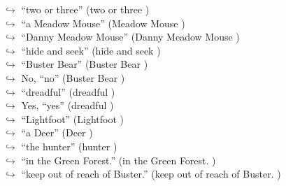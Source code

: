 \documentclass[11pt,a4paper, onecolumn]{article}
\begin{document}
\begin{figure}[t] \small \begin{tcolorbox}[boxsep=0pt,left=5pt,right=0pt,top=2pt,colback = yellow!5] \begin{dialogue}
 \small 
\colorbox{pink!25}{$\hookrightarrow$}
{ ``two or three'' (two or three ) }
\\
\colorbox{pink!25}{$\hookrightarrow$}
{ ``a Meadow Mouse'' (Meadow Mouse ) }
\\
\colorbox{pink!25}{$\hookrightarrow$}
{ ``Danny Meadow Mouse'' (Danny Meadow Mouse ) }
\\
\colorbox{pink!25}{$\hookrightarrow$}
{ ``hide and seek'' (hide and seek ) }
\\
\colorbox{pink!25}{$\hookrightarrow$}
{ ``Buster Bear'' (Buster Bear ) }
\\
\colorbox{pink!25}{$\hookrightarrow$}
\colorbox{red!25}{No,}
{ ``no'' (Buster Bear ) }
\\
\colorbox{pink!25}{$\hookrightarrow$}
{ ``dreadful'' (dreadful ) }
\\
\colorbox{pink!25}{$\hookrightarrow$}
\colorbox{red!25}{Yes,}
{ ``yes'' (dreadful ) }
\\
\colorbox{pink!25}{$\hookrightarrow$}
{ ``Lightfoot'' (Lightfoot ) }
\\
\colorbox{pink!25}{$\hookrightarrow$}
{ ``a Deer'' (Deer ) }
\\
\colorbox{pink!25}{$\hookrightarrow$}
{ ``the hunter'' (hunter ) }
\\
\colorbox{pink!25}{$\hookrightarrow$}
{ ``in the Green Forest.'' (in the Green Forest. ) }
\\
\colorbox{pink!25}{$\hookrightarrow$}
{ ``keep out of reach of Buster.'' (keep out of reach of Buster. ) }

\end{dialogue}
\end{tcolorbox}
\end{figure}
\end{document}
